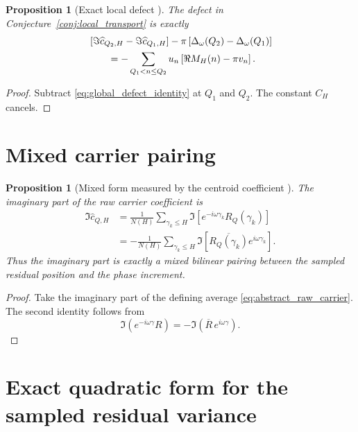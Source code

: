 \documentclass[11pt]{amsart}
\numberwithin{equation}{section}
\theoremstyle{plain}
\newtheorem{proposition}[theorem]{Proposition}
\theoremstyle{definition}
\theoremstyle{remark}
\newcommand{\1}{\mathbf{1}}
\begin{document}
\begin{proposition}[Exact local defect {}]
\label{prop:local_defect}
The defect in Conjecture~\ref{conj:local_transport} is exactly
\begin{align}
&
\left[
\Im\widehat c_{Q_2,H}-\Im\widehat c_{Q_1,H}
\right]
-
\pi\left[
\Delta_\omega(Q_2)-\Delta_\omega(Q_1)
\right]
\notag
\\
&\qquad
=
-\sum_{Q_1<n\leq Q_2}
u_n\left[
\Re M_H(n)-\pi v_n
\right].
\label{eq:local_defect_identity}
\end{align}
\end{proposition}

\begin{proof}
Subtract \eqref{eq:global_defect_identity} at \(Q_1\) and \(Q_2\).
The constant \(C_H\) cancels.
\end{proof}

\section{Mixed carrier pairing}
\label{sec:mixed_vs_self_area}

\begin{proposition}[Mixed form measured by the centroid coefficient {}]
\label{prop:mixed_area}
The imaginary part of the raw carrier coefficient is
\begin{align}
\Im\widehat c_{Q,H}
&=
\frac1{N(H)}
\sum_{\gamma_k\leq H}
\Im\left[
e^{-i\omega\gamma_k}R_Q(\gamma_k)
\right]
\label{eq:mixed_area_first}
\\
&=
-\frac1{N(H)}
\sum_{\gamma_k\leq H}
\Im\left[
\overline{R_Q(\gamma_k)}e^{i\omega\gamma_k}
\right].
\label{eq:mixed_area_second}
\end{align}
Thus the imaginary part is exactly a mixed bilinear pairing between the
sampled residual position and the phase increment.
\end{proposition}

\begin{proof}
Take the imaginary part of the defining average
\eqref{eq:abstract_raw_carrier}.  The second identity follows from
\[
\Im(e^{-i\omega\gamma}R)
=-\Im(\overline R\,e^{i\omega\gamma}).
\]
\end{proof}

\section{Exact quadratic form for the sampled residual variance}
\label{sec:exact_variance_form}
\end{document}
